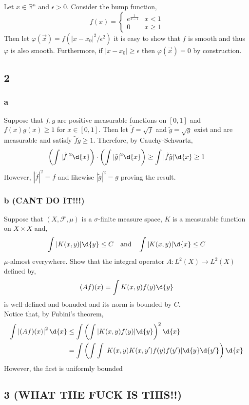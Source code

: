 \documentclass[12pt]{article}
\newcommand{\R}{\mathbb{R}}
\renewcommand{\F}{\mathcal{F}}
\begin{document}
Let $x \in \R^n$ and $\epsilon > 0$. Consider the bump function,
\[ f(x) = \begin{cases}
e^{\frac{1}{x - 1}} & x < 1
\\
0 & x \ge 1
\end{cases} \]
Then let $\varphi(\vec{x}) = f(|x-x_0|^2/\epsilon^2)$ it is easy to show that $f$ is smooth and thus $\varphi$ is also smooth. Furthermore, if $|x - x_0| \ge \epsilon$ then $\varphi(\vec{x}) = 0$ by construction.

\subsection{2}

\subsubsection{a}

Suppose that $f, g$ are positive measurable functions on $[0, 1]$ and $f(x) g(x) \ge 1$ for $x \in [0, 1]$. Then let $\tilde{f} = \sqrt{f}$ and $\tilde{g} = \sqrt{g}$ exist and are measurable and satisfy $\tilde{f} \tilde{g} \ge 1$. Therefore, by Cauchy-Schwartz,
\[ \left( \int |\tilde{f}|^2 \d{x} \right) \cdot \left( \int |\tilde{g}|^2 \d{x} \right) \ge \int |\tilde{f} \tilde{g}| \d{x} \ge 1 \]
However, $|\tilde{f}|^2 = f$ and likewise $|\tilde{g}|^2 = g$ proving the result.

\subsubsection{b (CANT DO IT!!!)}

Suppose that $(X, \F, \mu)$ is a $\sigma$-finite measure space, $K$ is a measurable function on $X \times X$ and,
\[ \int | K(x,y) | \d{y} \le C \quad \text{and} \quad \int |K(x,y)| \d{x} \le C \]
$\mu$-almost everywhere. Show that the integral operator $A : L^2(X) \to L^2(X)$ defined by,
\[ (Af)(x) = \int K(x,y) f(y) \d{y} \]
is well-defined and bonuded and its norm is bounded by $C$.
\bigskip\\
Notice that, by Fubini's theorem,
\begin{align*}
\int \left| (Af)(x) \right|^2 \d{x} & \le \int \left( \int |K(x,y) f(y)| \d{y} \right)^2 \d{x} 
\\
& = \int \left( \int \int |K(x, y) K(x, y') f(y) f(y') | \d{y} \d{y'} \right) \d{x}
\end{align*}
However, the first is uniformly bounded

\subsection{3 (WHAT THE FUCK IS THIS!!)}
\end{document}
